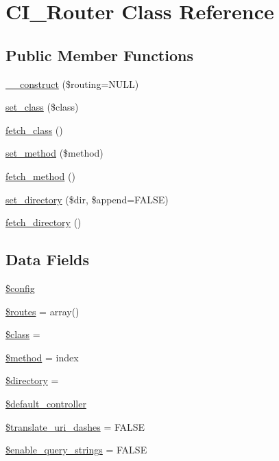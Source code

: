 \hypertarget{class_c_i___router}{}\section{C\+I\+\_\+\+Router Class Reference}
\label{class_c_i___router}
\subsection*{Public Member Functions}
\begin{DoxyCompactItemize}
\item 
\hyperlink{class_c_i___router_a9b81050c9907794a374f5088743a0252}{\+\_\+\+\_\+construct} (\$routing=N\+U\+L\+L)
\item 
\hyperlink{class_c_i___router_afbb540df5c161fe69909a5f8182f910f}{set\+\_\+class} (\$class)
\item 
\hyperlink{class_c_i___router_af5586c3f514021e9e2588e102620d237}{fetch\+\_\+class} ()
\item 
\hyperlink{class_c_i___router_a6a42036a115946acdaf0975c994106fb}{set\+\_\+method} (\$method)
\item 
\hyperlink{class_c_i___router_ad408b28e3a095e7435f21e95d93e7714}{fetch\+\_\+method} ()
\item 
\hyperlink{class_c_i___router_a80573f758526ffa1beba61be5d45baff}{set\+\_\+directory} (\$dir, \$append=F\+A\+L\+S\+E)
\item 
\hyperlink{class_c_i___router_a7a089f2cfae731dcc9e59a71d20208ef}{fetch\+\_\+directory} ()
\end{DoxyCompactItemize}
\subsection*{Data Fields}
\begin{DoxyCompactItemize}
\item 
\hyperlink{class_c_i___router_a49c7011be9c979d9174c52a8b83e5d8e}{\$config}
\item 
\hyperlink{class_c_i___router_a8f7eb04a54e0f0bfc0cedeb9899ce4a8}{\$routes} = array()
\item 
\hyperlink{class_c_i___router_a252ba022809910ea710a068fc1bab657}{\$class} = \textquotesingle{}\textquotesingle{}
\item 
\hyperlink{class_c_i___router_a12661b2fc0f57f97e30a1620889ce9c6}{\$method} = \textquotesingle{}index\textquotesingle{}
\item 
\hyperlink{class_c_i___router_a1b07c630eb02f770a082a013373a16d6}{\$directory} = \textquotesingle{}\textquotesingle{}
\item 
\hyperlink{class_c_i___router_ab949cccd963058f0937d04bc26ee24a7}{\$default\+\_\+controller}
\item 
\hyperlink{class_c_i___router_a9693c124c7019ed8ec57166661044ba2}{\$translate\+\_\+uri\+\_\+dashes} = F\+A\+L\+S\+E
\item 
\hyperlink{class_c_i___router_a8495f59271097c83f7703d433d96ff6d}{\$enable\+\_\+query\+\_\+strings} = F\+A\+L\+S\+E
\end{DoxyCompactItemize}

